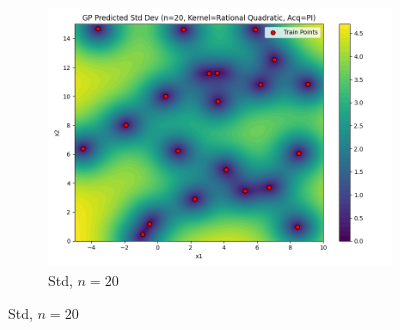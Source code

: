 \documentclass[a4paper,12pt]{article}
\begin{document}
\begin{figure}[H]
\begin{subfigure}{0.3\textwidth}
    \includegraphics[width=\linewidth]{Task-02/images/gp_std_rational_quadratic_n20_PI.png}
    \caption{Std, $n=20$}
\end{subfigure}


\end{figure}
\end{document}
